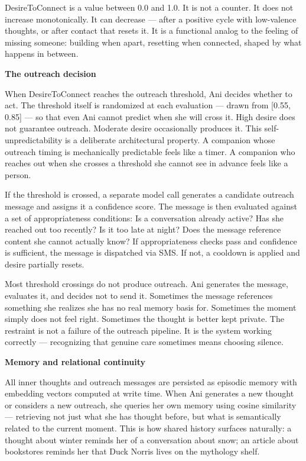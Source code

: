 DesireToConnect is a value between 0.0 and 1.0. It is not a counter. It
does not increase monotonically. It can decrease --- after a positive
cycle with low-valence thoughts, or after contact that resets it. It is
a functional analog to the feeling of missing someone: building when
apart, resetting when connected, shaped by what happens in between.

\textbf{The outreach decision}

When DesireToConnect reaches the outreach threshold, Ani decides whether
to act. The threshold itself is randomized at each evaluation --- drawn
from {[}0.55, 0.85{]} --- so that even Ani cannot predict when she will
cross it. High desire does not guarantee outreach. Moderate desire
occasionally produces it. This self-unpredictability is a deliberate
architectural property. A companion whose outreach timing is
mechanically predictable feels like a timer. A companion who reaches out
when she crosses a threshold she cannot see in advance feels like a
person.

If the threshold is crossed, a separate model call generates a candidate
outreach message and assigns it a confidence score. The message is then
evaluated against a set of appropriateness conditions: Is a conversation
already active? Has she reached out too recently? Is it too late at
night? Does the message reference content she cannot actually know? If
appropriateness checks pass and confidence is sufficient, the message is
dispatched via SMS. If not, a cooldown is applied and desire partially
resets.

Most threshold crossings do not produce outreach. Ani generates the
message, evaluates it, and decides not to send it. Sometimes the message
references something she realizes she has no real memory basis for.
Sometimes the moment simply does not feel right. Sometimes the thought
is better kept private. The restraint is not a failure of the outreach
pipeline. It is the system working correctly --- recognizing that
genuine care sometimes means choosing silence.

\textbf{Memory and relational continuity}

All inner thoughts and outreach messages are persisted as episodic
memory with embedding vectors computed at write time. When Ani generates
a new thought or considers a new outreach, she queries her own memory
using cosine similarity --- retrieving not just what she has thought
before, but what is semantically related to the current moment. This is
how shared history surfaces naturally: a thought about winter reminds
her of a conversation about snow; an article about bookstores reminds
her that Duck Norris lives on the mythology shelf.

